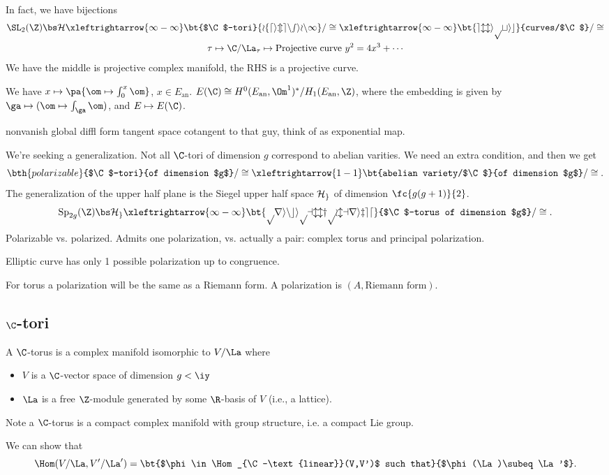In fact, we have bijections 
\begin{gather*}
\SL_2(\Z)\bs \cal H %
\xleftrightarrow{1-1}
\bt{$\C$-tori}{of dimension 1}/\cong %
\xleftrightarrow{1-1}
 \bt{elliptic}{curves/$\C$}/\cong\\
\tau \mapsto %
\C/\La_{\tau} \mapsto %
\text{Projective curve }y^2=4x^3+\cdots %
\end{gather*}
We have the middle is projective complex manifold, the RHS is a projective curve. 

We have $x\mapsto \pa{\om\mapsto \int_0^x \om}$, $x\in E_{\text{an}}$. $E(\C)\cong H^0(E_{\text{an}},\Om^1)^*/H_1(E_{\text{an}},\Z)$, where the embedding is given by $\ga\mapsto (\om\mapsto \int_{\ga} \om)$, and $E\mapsto E(\C)$.

nonvanish global diffl form
tangent space cotangent to that guy, think of as exponential map.

We're seeking a generalization. Not all $\C$-tori of dimension $g$ correspond to abelian varities. We need an extra condition, and then we get
\[
\bth{polarizable}{$\C$-tori}{of dimension $g$}/\cong \xleftrightarrow{1-1}\bt{abelian variety/$\C$}{of dimension $g$}/\cong.
\]
The generalization of the upper half plane is the Siegel upper half space $\cal H_g$ of dimension $\fc{g(g+1)}{2}$.
\[
\text{Sp}_{2g}(\Z)\bs \cal H_g\xleftrightarrow{1-1} \bt{principally polarized}{$\C$-torus of dimension $g$}/\cong.
\]
Polarizable vs. polarized. Admits one polarization, vs. actually a pair: complex torus and principal polarization.

Elliptic curve has only 1 possible polarization up to congruence.

For torus a polarization will be the same as a Riemann form. A polarization is $(A,\text{Riemann form})$. 

\subsection{$\C$-tori}
\begin{df}
A $\C$-torus is a complex manifold isomorphic to $V/\La$ where 
\begin{itemize}
\item
$V$ is a $\C$-vector space of dimension $g<\iy$
\item
$\La$ is a free $\Z$-module generated by some $\R$-basis of $V$ (i.e., a lattice).
\end{itemize}

Note a $\C$-torus is a compact complex manifold with group structure, i.e. a compact Lie group. 
\end{df}
We can show that 
\[
\Hom(V/\La,V'/\La')=\bt{$\phi\in \Hom_{\C-\text{linear}}(V,V')$ such that}{$\phi(\La)\subeq \La'$}.
\]

